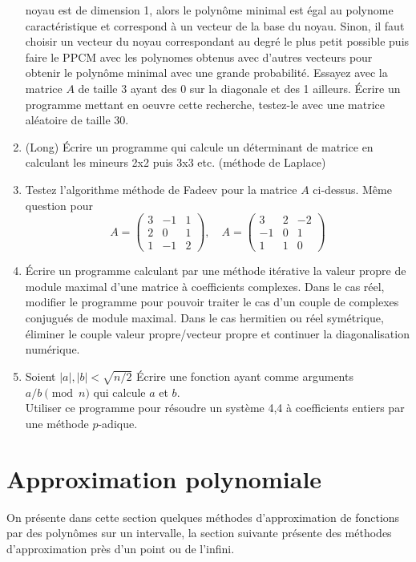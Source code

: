 \documentclass[a4paper,11pt]{article}
\begin{document}
\begin{giacjshere}
\begin{enumerate}
noyau est de dimension 1, alors le polynôme minimal est égal au
polynome caractéristique et correspond à un vecteur de la base du noyau.
Sinon, il faut choisir un vecteur du noyau correspondant au degré
le plus petit possible puis faire le PPCM avec les polynomes obtenus
avec d'autres vecteurs pour obtenir le polynôme minimal avec une grande
probabilité.
Essayez avec la matrice $A$ de taille 3 ayant des 0 sur la diagonale et 
des 1 ailleurs.
\'Ecrire un programme mettant en oeuvre cette recherche, testez-le avec
une matrice al\'eatoire de taille 30.
\item (Long) \'Ecrire un programme qui calcule un d\'eterminant de matrice
en calculant les mineurs 2x2 puis 3x3 etc. (m\'ethode de Laplace)
\item Testez l'algorithme méthode de Fadeev pour la matrice $A$ ci-dessus.
Même question pour 
\[ A=\left(\begin{array}{ccc}
 3 & -1 & 1 \\
2 &0 &1 \\
1 & -1 & 2 
\end{array}\right), \quad 
A=\left(\begin{array}{ccc}
 3 & 2 & -2 \\
-1 &0 &1 \\
1 & 1 & 0 
\end{array}\right) 
 \]
\item \'Ecrire un programme calculant par une méthode itérative
la valeur propre de module maximal d'une matrice à coefficients
complexes. Dans le cas réel, modifier le programme pour pouvoir
traiter le cas d'un couple de complexes conjugués de module maximal.
Dans le cas hermitien ou réel symétrique, éliminer le couple valeur
propre/vecteur propre et continuer la diagonalisation numérique.
\item Soient $|a|,|b|<\sqrt{n/2}$
\'Ecrire une fonction ayant comme arguments $a/b \pmod n$ 
qui calcule $a$ et $b$.\\
Utiliser ce programme pour résoudre un système 4,4 à coefficients entiers
par une méthode $p$-adique.
\end{enumerate}

\pagebreak


\section{Approximation polynomiale} \label{sec:interp}
On présente dans cette section quelques méthodes d'approximation
de fonctions par des polynômes sur un intervalle, la section suivante 
présente des méthodes d'approximation près d'un point ou de l'infini.


\end{giacjshere}
\end{document}
